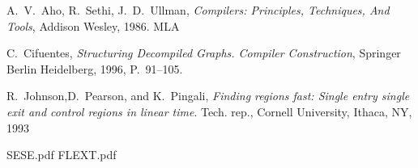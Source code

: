 \documentclass[conference]{IEEEtran}
\begin{document}
\begin{thebibliography}{9}
 A.~V.~Aho, R.~Sethi, J.~D.~Ullman, \emph{Compilers: Principles, Techniques, And Tools}, Addison Wesley, 1986.  MLA

 C.~Cifuentes, \emph{Structuring Decompiled Graphs. Compiler Construction}, Springer Berlin Heidelberg, 1996, P.~91--105.

 R.~Johnson,D.~Pearson, and K.~Pingali, \emph{Finding regions fast: Single entry single exit and control regions in linear time}. Tech. rep., Cornell University, Ithaca, NY, 1993

 SESE.pdf
 FLEXT.pdf

\end{thebibliography}




\end{document}
